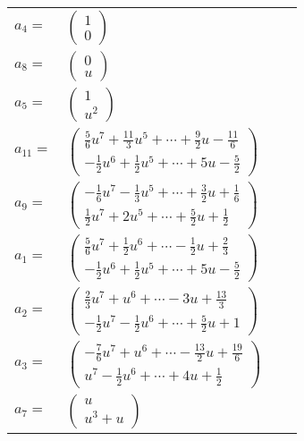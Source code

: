 \documentclass[1p]{elsarticle_modified}
\theoremstyle{definition}
\begin{document}
\begin{tabular}{m{7pt} m{180pt} m{7pt} m{180pt} }
\flushright $a_{4}=$&$\begin{pmatrix}1\\0\end{pmatrix}$ \\
\flushright $a_{8}=$&$\begin{pmatrix}0\\u\end{pmatrix}$ \\
\flushright $a_{5}=$&$\begin{pmatrix}1\\u^2\end{pmatrix}$ \\
\flushright $a_{11}=$&$\begin{pmatrix}\frac{5}{6} u^7+\frac{11}{3} u^5+\cdots+\frac{9}{2} u-\frac{11}{6}\\-\frac{1}{2} u^6+\frac{1}{2} u^5+\cdots+5 u-\frac{5}{2}\end{pmatrix}$ \\
\flushright $a_{9}=$&$\begin{pmatrix}-\frac{1}{6} u^7-\frac{1}{3} u^5+\cdots+\frac{3}{2} u+\frac{1}{6}\\\frac{1}{2} u^7+2 u^5+\cdots+\frac{5}{2} u+\frac{1}{2}\end{pmatrix}$ \\
\flushright $a_{1}=$&$\begin{pmatrix}\frac{5}{6} u^7+\frac{1}{2} u^6+\cdots-\frac{1}{2} u+\frac{2}{3}\\-\frac{1}{2} u^6+\frac{1}{2} u^5+\cdots+5 u-\frac{5}{2}\end{pmatrix}$ \\
\flushright $a_{2}=$&$\begin{pmatrix}\frac{2}{3} u^7+u^6+\cdots-3 u+\frac{13}{3}\\-\frac{1}{2} u^7-\frac{1}{2} u^6+\cdots+\frac{5}{2} u+1\end{pmatrix}$ \\
\flushright $a_{3}=$&$\begin{pmatrix}-\frac{7}{6} u^7+u^6+\cdots-\frac{13}{2} u+\frac{19}{6}\\u^7-\frac{1}{2} u^6+\cdots+4 u+\frac{1}{2}\end{pmatrix}$ \\
\flushright $a_{7}=$&$\begin{pmatrix}u\\u^3+u\end{pmatrix}$ \\

\end{tabular}
\end{document}
